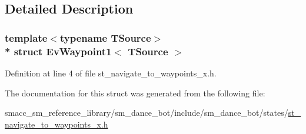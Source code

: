 \subsection{Detailed Description}
\subsubsection*{template$<$typename T\+Source$>$\\*
struct Ev\+Waypoint1$<$ T\+Source $>$}



Definition at line 4 of file st\+\_\+navigate\+\_\+to\+\_\+waypoints\+\_\+x.\+h.



The documentation for this struct was generated from the following file\+:\begin{DoxyCompactItemize}
\item 
smacc\+\_\+sm\+\_\+reference\+\_\+library/sm\+\_\+dance\+\_\+bot/include/sm\+\_\+dance\+\_\+bot/states/\hyperlink{st__navigate__to__waypoints__x_8h}{st\+\_\+navigate\+\_\+to\+\_\+waypoints\+\_\+x.\+h}\end{DoxyCompactItemize}
